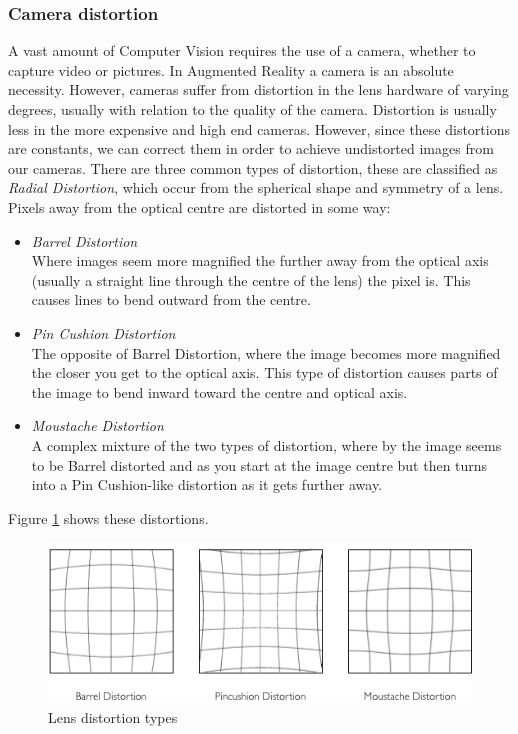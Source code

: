 \documentclass[11pt]{article}
\begin{document}
\subsubsection{Camera distortion}
A vast amount of Computer Vision requires the use of a camera, whether to 
capture video or pictures. In Augmented Reality a camera is an absolute
necessity. However, cameras suffer from distortion
in the lens hardware of varying degrees, usually with relation to the quality
of the camera. Distortion is usually less in the more expensive and 
high end cameras. However, since these distortions are constants, we can
correct them in order to achieve undistorted images from our cameras.
There are three common types of distortion, these are classified as
\textit{Radial Distortion}, which occur from the spherical shape and
symmetry of a lens. Pixels away from the optical centre are distorted
in some way:
\begin{itemize}
	\item \textit{Barrel Distortion} \\
			Where images seem more magnified the further away from the optical
			axis (usually a straight line through the centre of the lens) 
			the pixel is. This causes lines to bend outward from the centre.
	\item \textit{Pin Cushion Distortion} \\
			The opposite of Barrel Distortion, where the image becomes more 
			magnified the closer you get to the optical axis. This type of
			distortion causes parts of the image to bend inward toward the 
			centre and optical axis.
	\item \textit{Moustache Distortion} \\
			A complex mixture of the two types of distortion, where by the 
			image seems to be Barrel distorted and as you start at the
			image centre but then turns into a Pin Cushion-like distortion
			as it gets further away.
\end{itemize}

Figure \ref{fig:distortions} shows these distortions.

\begin{figure}[H]
	\centering
	\includegraphics[scale=0.8]{pics/distortions.png}
	\caption{Lens distortion types}
	\label{fig:distortions}
\end{figure}
\end{document}
